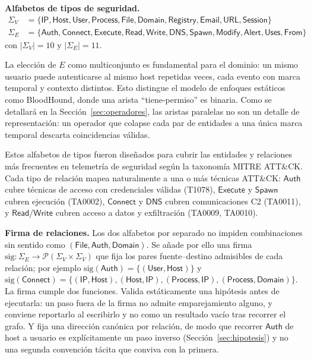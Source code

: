 \documentclass[11pt,a4paper]{article}
\begin{document}
\textbf{Alfabetos de tipos de seguridad.}
\begin{align*}
\Sigma_V &= \{\mathsf{IP}, \mathsf{Host}, \mathsf{User}, \mathsf{Process},
\mathsf{File}, \mathsf{Domain}, \mathsf{Registry}, \mathsf{Email},
\mathsf{URL}, \mathsf{Session}\}\\
\Sigma_E &= \{\mathsf{Auth}, \mathsf{Connect}, \mathsf{Execute}, \mathsf{Read},
\mathsf{Write}, \mathsf{DNS}, \mathsf{Spawn}, \mathsf{Modify}, \mathsf{Alert},
\mathsf{Uses}, \mathsf{From}\}
\end{align*}
con $|\Sigma_V| = 10$ y $|\Sigma_E| = 11$.

La elección de $E$ como multiconjunto es fundamental para el dominio: un mismo
usuario puede autenticarse al mismo host repetidas veces, cada evento con marca
temporal y contexto distintos. Esto distingue el modelo de enfoques estáticos
como BloodHound, donde una arista ``tiene-permiso'' es binaria. Como se
detallará en la Sección~\ref{sec:operadores}, las aristas paralelas no son un
detalle de representación: un operador que colapse cada par de entidades a una
única marca temporal descarta coincidencias válidas.

Estos alfabetos de tipos fueron diseñados para cubrir las entidades y
relaciones más frecuentes en telemetría de seguridad según la taxonomía MITRE
ATT\&CK. Cada tipo de relación mapea naturalmente a una o más técnicas ATT\&CK:
$\mathsf{Auth}$ cubre técnicas de acceso con credenciales válidas (T1078),
$\mathsf{Execute}$ y $\mathsf{Spawn}$ cubren ejecución (TA0002),
$\mathsf{Connect}$ y $\mathsf{DNS}$ cubren comunicaciones C2 (TA0011), y
$\mathsf{Read}$/$\mathsf{Write}$ cubren acceso a datos y exfiltración (TA0009,
TA0010).

\textbf{Firma de relaciones.} Los dos alfabetos por separado no impiden
combinaciones sin sentido como $(\mathsf{File}, \mathsf{Auth},
\mathsf{Domain})$. Se añade por ello una firma
$\mathrm{sig} : \Sigma_E \to \mathcal{P}(\Sigma_V \times \Sigma_V)$ que fija
los pares fuente--destino admisibles de cada relación; por ejemplo
$\mathrm{sig}(\mathsf{Auth}) = \{(\mathsf{User}, \mathsf{Host})\}$ y
$\mathrm{sig}(\mathsf{Connect}) = \{(\mathsf{IP}, \mathsf{Host}),
(\mathsf{Host}, \mathsf{IP}), (\mathsf{Process}, \mathsf{IP}),
(\mathsf{Process}, \mathsf{Domain})\}$. La firma cumple dos funciones. Valida
estáticamente una hipótesis antes de ejecutarla: un paso fuera de la firma no
admite emparejamiento alguno, y conviene reportarlo al escribirlo y no como un
resultado vacío tras recorrer el grafo. Y fija una dirección canónica por
relación, de modo que recorrer $\mathsf{Auth}$ de host a usuario es
explícitamente un paso inverso (Sección~\ref{sec:hipotesis}) y no una segunda
convención tácita que conviva con la primera.
\end{document}
